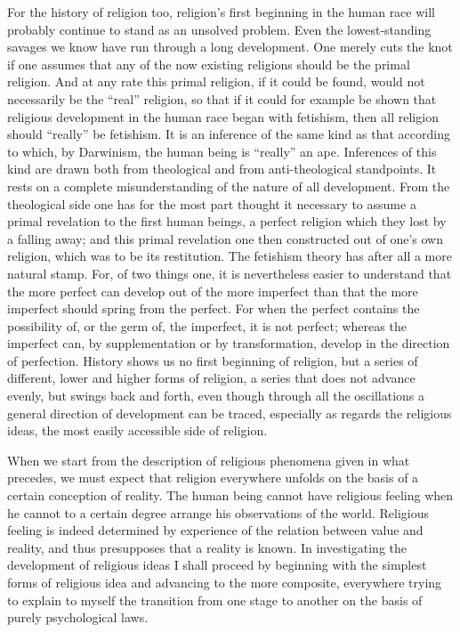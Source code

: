 \documentclass[12pt,a4paper]{book}
\newcommand{\opage}[1]{\marginnote{\footnotesize\textit{[#1]}}}
\begin{document}
For the history of religion too, religion's first beginning in the human race will
probably continue to stand as an unsolved problem. Even the lowest-standing savages
we know have run through a long development. One merely cuts the knot if one assumes
that any of the now existing religions should be the primal religion. And at any
rate this primal religion, if it could be found, would not necessarily be the
``real'' religion, so that if it could for example be shown that religious
development in the human race began with fetishism, then all religion should
``really'' be fetishism. It is an inference of the same kind as that according to
which, by Darwinism, the human being is ``really'' an ape. Inferences of this kind
are drawn both from theological 
\opage{86}and from anti-theological standpoints. It rests on a
complete misunderstanding of the nature of all development. From the theological
side one has for the most part thought it necessary to assume a primal revelation to
the first human beings, a perfect religion which they lost by a falling away; and
this primal revelation one then constructed out of one's own religion, which was to
be its restitution. The fetishism theory has after all a more natural stamp. For, of
two things one, it is nevertheless easier to understand that the more perfect can
develop out of the more imperfect than that the more imperfect should spring from the
perfect. For when the perfect contains the possibility of, or the germ of, the
imperfect, it is not perfect; whereas the imperfect can, by supplementation or by
transformation, develop in the direction of perfection. History shows us no first
beginning of religion, but a series of different, lower and higher forms of religion,
a series that does not advance evenly, but swings back and forth, even though through
all the oscillations a general direction of development can be traced, especially as
regards the religious ideas, the most easily accessible side of religion.

When we start from the description of religious phenomena given in what precedes, we
must expect that religion everywhere unfolds on the basis of a certain conception of
reality. The human being cannot have religious feeling when he cannot to a certain
degree arrange his observations of the world. Religious feeling is indeed determined
by experience of the relation between value and reality, and thus presupposes that a
reality is known. In investigating the development of religious ideas I shall proceed
by beginning with the simplest forms of religious idea and advancing to the more
composite, everywhere trying to explain to myself the transition from one stage to
another on the basis of purely psychological laws.
\end{document}
